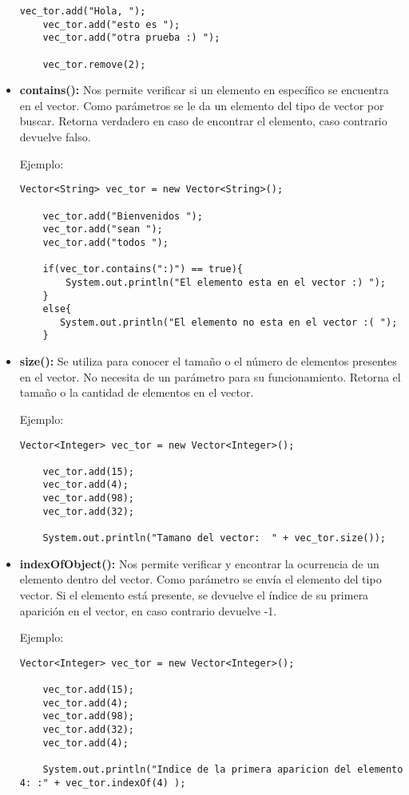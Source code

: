 \documentclass[12pt, letterpaper]{article} %
\begin{document}
\begin{itemize}
\begin{lstlisting}[frame=single]
    vec_tor.add("Hola, ");
    vec_tor.add("esto es ");
    vec_tor.add("otra prueba :) ");

    vec_tor.remove(2);
    \end{lstlisting}

    \item \textbf{contains():} Nos permite verificar si un elemento en específico se encuentra en el vector. Como parámetros se le da un elemento del tipo de vector por buscar. Retorna verdadero en caso de encontrar el elemento, caso contrario devuelve falso.

    Ejemplo:
    \lstset{language = Java, breaklines=true, basicstyle=\footnotesize}
    \begin{lstlisting}[frame=single]
    Vector<String> vec_tor = new Vector<String>();

    vec_tor.add("Bienvenidos ");
    vec_tor.add("sean ");
    vec_tor.add("todos ");

    if(vec_tor.contains(":)") == true){
        System.out.println("El elemento esta en el vector :) ");
    }
    else{
	   System.out.println("El elemento no esta en el vector :( ");
    }
    \end{lstlisting}

    \item \textbf{size():} Se utiliza para conocer el tamaño o el número de elementos presentes en el vector. No necesita de un parámetro para su funcionamiento. Retorna el tamaño o la cantidad de elementos en el vector.

    Ejemplo:
    \lstset{language = Java, breaklines=true, basicstyle=\footnotesize}
    \begin{lstlisting}[frame=single]
    Vector<Integer> vec_tor = new Vector<Integer>();

    vec_tor.add(15);
    vec_tor.add(4);
    vec_tor.add(98);
    vec_tor.add(32);

    System.out.println("Tamano del vector:  " + vec_tor.size());
    \end{lstlisting}
    
    \item \textbf{indexOfObject():} Nos permite verificar y encontrar la ocurrencia de un elemento dentro del vector. Como parámetro se envía el elemento del tipo vector. Si el elemento está presente, se devuelve el índice de su primera aparición en el vector, en caso contrario devuelve -1.
    
    Ejemplo:
    \lstset{language = Java, breaklines=true, basicstyle=\footnotesize}
    \begin{lstlisting}[frame=single]
    Vector<Integer> vec_tor = new Vector<Integer>();

    vec_tor.add(15);
    vec_tor.add(4);
    vec_tor.add(98);
    vec_tor.add(32);
    vec_tor.add(4);

    System.out.println("Indice de la primera aparicion del elemento 4: :" + vec_tor.indexOf(4) );
    \end{lstlisting}
\end{itemize}
\end{document}
